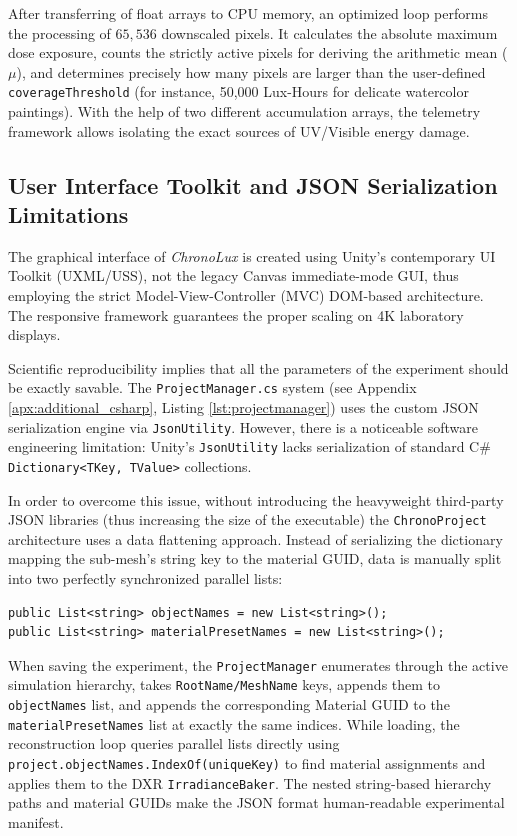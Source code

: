 After transferring of float arrays to CPU memory, an optimized loop performs the processing of $65,536$ downscaled pixels. It calculates the absolute maximum dose exposure, counts the strictly active pixels for deriving the arithmetic mean ($\mu$), and determines precisely how many pixels are larger than the user-defined \texttt{coverageThreshold} (for instance, 50,000 Lux-Hours for delicate watercolor paintings). With the help of two different accumulation arrays, the telemetry framework allows isolating the exact sources of UV/Visible energy damage.

\subsection{User Interface Toolkit and JSON Serialization Limitations}

The graphical interface of \textit{ChronoLux} is created using Unity's contemporary UI Toolkit (UXML/USS), not the legacy Canvas immediate-mode GUI, thus employing the strict Model-View-Controller (MVC) DOM-based architecture. The responsive framework guarantees the proper scaling on 4K laboratory displays.

Scientific reproducibility implies that all the parameters of the experiment should be exactly savable. The \texttt{ProjectManager.cs} system (see Appendix \ref{apx:additional_csharp}, Listing \ref{lst:projectmanager}) uses the custom JSON serialization engine via \texttt{JsonUtility}. However, there is a noticeable software engineering limitation: Unity's \texttt{JsonUtility} lacks serialization of standard C\# \texttt{Dictionary<TKey, TValue>} collections.

In order to overcome this issue, without introducing the heavyweight third-party JSON libraries (thus increasing the size of the executable) the \texttt{ChronoProject} architecture uses a data flattening approach. Instead of serializing the dictionary mapping the sub-mesh's string key to the material GUID, data is manually split into two perfectly synchronized parallel lists:
\begin{lstlisting}[language={[Sharp]C}]
public List<string> objectNames = new List<string>();
public List<string> materialPresetNames = new List<string>();
\end{lstlisting}

When saving the experiment, the \texttt{ProjectManager} enumerates through the active simulation hierarchy, takes \texttt{RootName/MeshName} keys, appends them to \texttt{objectNames} list, and appends the corresponding Material GUID to the \texttt{materialPresetNames} list at exactly the same indices. While loading, the reconstruction loop queries parallel lists directly using \texttt{project.objectNames.IndexOf(uniqueKey)} to find material assignments and applies them to the DXR \texttt{IrradianceBaker}. The nested string-based hierarchy paths and material GUIDs make the JSON format human-readable experimental manifest.

